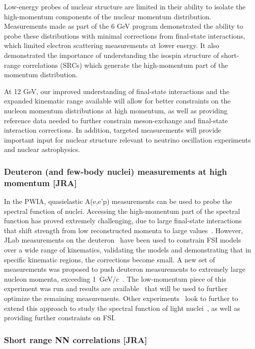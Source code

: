 Low-energy probes of nuclear structure are limited in their ability to isolate the high-momentum components of the nuclear momentum distribution. Measurements made as part of the 6 GeV program demonstrated the ability to probe these distributions with minimal corrections from final-state interactions, which limited electron scattering measurements at lower energy. It also demonstrated the importance of understanding the isospin structure of short-range correlations (SRCs) which generate the high-momentum part of the momentum distribution.

At 12 GeV, our improved understanding of final-state interactions and the expanded kinematic range available will allow for better constraints on the nucleon momentum distributions at high momentum, as well as providing reference data needed to further constrain meson-exchange and final-state interaction corrections. In addition, targeted measurements will provide important input for nuclear structure relevant to neutrino oscillation experiments and nuclear astrophysics.


\subsubsection{Deuteron (and few-body nuclei) measurements at high momentum [JRA]}

In the PWIA, quasielastic A(e,e'p) measurements can be used to probe the spectral function of nuclei. Accessing the high-momentum part of the spectral function has proved extremely challenging, due to large final-state interactions that shift strength from low reconstructed momenta to large values~\cite{Sargsian:2002wc}. However, JLab measurements on the deuteron~\cite{Arrington:2011xs}
have been used to constrain FSI models over a wide range of kinematics, validating the models and demonstrating that in specific kinematic regions, the corrections become small. A new set of measurements was proposed to push deuteron measurements to extremely large nucleon momenta, exceeding 1~GeV/c~\cite{proposal}. The low-momentum piece of this experiment was run and results are available~\cite{HallC:2020kdm} that will be used to further optimize the remaining measurements. Other experiments~\cite{} look to further to extend this approach to study the spectral function of light nuclei~\cite{}, as well as providing further constraints on FSI.

\subsubsection{Short range NN correlations [JRA]}

